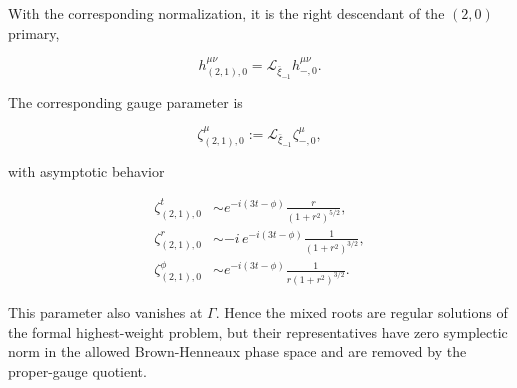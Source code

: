 With the corresponding normalization, it is the right descendant of the \((2,0)\) primary,

\[
h_{(2,1),0}^{\mu\nu}
=\mathcal{L}_{\bar\xi_{-1}}h_{-,0}^{\mu\nu}.
\]

The corresponding gauge parameter is

\[
\zeta_{(2,1),0}^{\mu}
:=\mathcal{L}_{\bar\xi_{-1}}\zeta_{-,0}^{\mu},
\]

with asymptotic behavior

\begin{align}
\zeta_{(2,1),0}^{t}&\sim e^{-i(3t-\phi)}\frac{r}{(1+r^2)^{5/2}},\\
\zeta_{(2,1),0}^{r}&\sim-i\,e^{-i(3t-\phi)}\frac{1}{(1+r^2)^{3/2}},\\
\zeta_{(2,1),0}^{\phi}&\sim e^{-i(3t-\phi)}\frac{1}{r(1+r^2)^{3/2}}.
\end{align}

This parameter also vanishes at \(\displaystyle{\Gamma}\). Hence the mixed roots are regular solutions of the formal highest-weight problem, but their representatives have zero symplectic norm in the allowed Brown-Henneaux phase space and are removed by the proper-gauge quotient.
